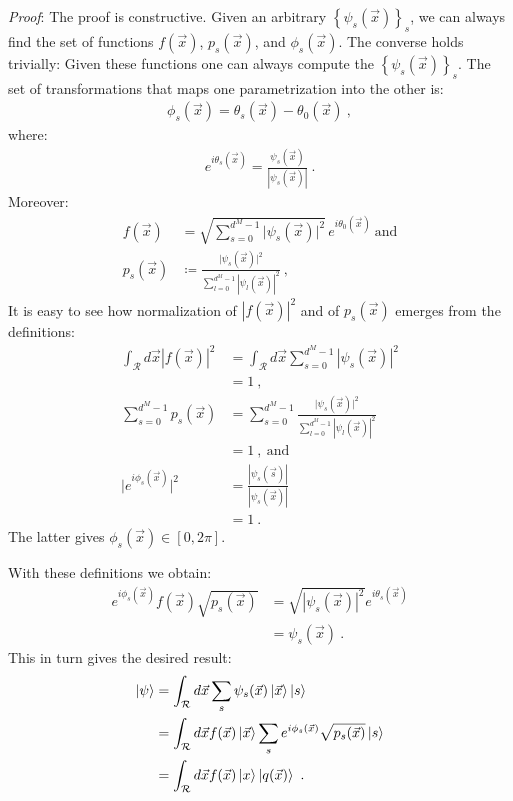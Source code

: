 \documentclass[nofootinbib,pre,twocolumn,showpacs,showkeys,groupaddress,preprintnumbers,floatfix]{revtex4-1}
\newcommand{\1}{\mathbbm{1}}
\begin{document}
\emph{Proof}: The proof is constructive. Given an arbitrary
$\left\{ \psi_s(\vec{x}) \right\}_s$, we can always find the set of functions
$f(\vec{x})$, $p_s(\vec{x})$, and $\phi_s(\vec{x})$. The converse holds
trivially: Given these functions one can always compute the $\left\{
\psi_s(\vec{x}) \right\}_s$. The set of transformations that maps one
parametrization into the other is:
\begin{align*}
\phi_s(\vec{x}) = \theta_s(\vec{x}) - \theta_0(\vec{x})
  ~,
\end{align*}
where:
\begin{align*}
e^{i\theta_s(\vec{x})} = \frac{\psi_s(\vec{x})}{|\psi_s(\vec{x})|}
  ~.
\end{align*}
Moreover:
\begin{align*}
f(\vec{x}) & = \sqrt{\sum_{s=0}^{d^M-1} \vert \psi_s(\vec{x}) \vert^2}
  \, e^{i \theta_0(\vec{x})} ~\text{and} \\
p_s(\vec{x}) & \coloneqq
  \frac{\vert \psi_s(\vec{x})\vert^2}{\sum_{l=0}^{d^M-1}\left\vert \psi_l(\vec{x})\right\vert^2}
  ~,
\end{align*}
It is easy to see how normalization of $|f(\vec{x})|^2$ and of $p_s(\vec{x})$ emerges from the definitions:
\begin{align*}
\int_{\mathcal{R}} d\vec{x} \left\vert f(\vec{x})\right\vert^2
  & = \int_{\mathcal{R}} d\vec{x}
  \sum_{s=0}^{d^M-1} \left\vert \psi_s(\vec{x}) \right\vert^2 \\
  & = 1 ~,\\
\sum_{s=0}^{d^M-1} p_s(\vec{x})
  & = \sum_{s=0}^{d^M-1}
  \frac{\vert \psi_s(\vec{x})\vert^2}{\sum_{l=0}^{d^M-1}\left\vert
  \psi_l(\vec{x})\right\vert^2} \\
  & = 1 ~,~\text{and} \\
\vert e^{i\phi_s(\vec{x})}\vert^2
  & = \frac{|\psi_s(\vec{s})|}{|\psi_s(\vec{x})|} \\
  & = 1
  ~.
\end{align*}
The latter gives $\phi_s(\vec{x}) \in [0,2\pi]$.

With these definitions we obtain:
\begin{align*}
e^{i\phi_s(\vec{x})} f(\vec{x}) \sqrt{p_s(\vec{x})}
  & = \sqrt{|\psi_s(\vec{x})|^2} e^{i\theta_s(\vec{x})} \\
  & = \psi_s(\vec{x})
  ~.
\end{align*}
This in turn gives the desired result:
\begin{align*}
\ket{\psi} & = \int_{\mathcal{R}} d\vec{x} \sum_{s} \psi_s(\vec{x})\ket{\vec{x}} \ket{s} \\
& = \int_{\mathcal{R}} d\vec{x} f(\vec{x}) \ket{\vec{x}}\sum_{s} e^{i\phi_s(\vec{x})}   \sqrt{p_s(\vec{x})}  \ket{s} \\
& = \int_{\mathcal{R}}d\vec{x} f(\vec{x}) \ket{x}\ket{q(\vec{x})}
  ~.
\end{align*}

\end{document}
